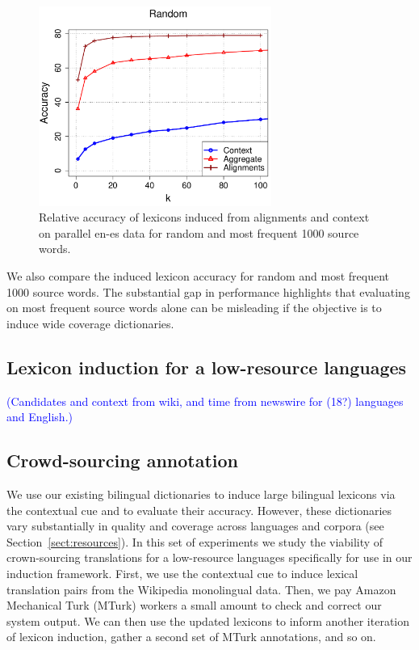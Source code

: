 \documentclass{article}
\newcommand{\todo}[1]{\textcolor{blue}{(#1)}}
\newcommand{\secref}[1]{Section~\ref{#1}}
\begin{document}
\begin{figure}[h!]
\centerline{\mbox{\includegraphics[width=3in]{figures/exp2/alignvscontext}}}
\caption{Relative accuracy of lexicons induced from alignments and context on parallel en-es data for random and most frequent 1000 source words.}
\label{fig:exp2}
\end{figure}

We also compare the induced lexicon accuracy for random and most frequent 1000 source words.  The substantial gap in performance highlights that evaluating on most frequent source words alone can be misleading if the objective is to induce wide coverage dictionaries.

\subsection{Lexicon induction for a low-resource languages}

\todo{Candidates and context from wiki, and time from newswire for (18?) languages and English.}

\subsection{Crowd-sourcing annotation}

We use our existing bilingual dictionaries to induce large bilingual lexicons via the contextual cue and to evaluate their accuracy.  However, these dictionaries vary substantially in quality and coverage across languages and corpora (see \secref{sect:resources}).  In this set of experiments we study \cite{Irvine:2010} the viability of crown-sourcing translations for a low-resource languages specifically for use in our induction framework.  First, we use the contextual cue to induce lexical translation pairs from the Wikipedia monolingual data. Then, we pay Amazon Mechanical Turk (MTurk) workers a small amount to check and correct our system output. We can then use the updated lexicons to inform another iteration of lexicon induction, gather a second set of MTurk annotations, and so on. \\
\end{document}
